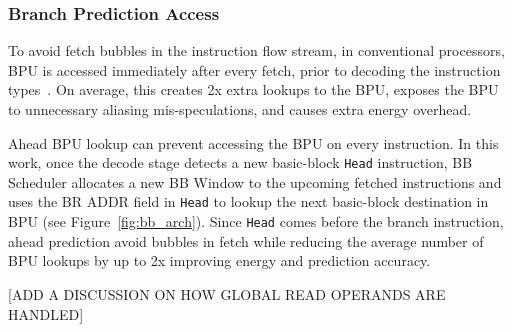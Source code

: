 \subsubsection{Branch Prediction Access}

To avoid fetch bubbles in the instruction flow stream, in conventional
processors, BPU is accessed immediately after every fetch, prior to decoding the
instruction types~\cite{ref:EV8}. On average, this creates 2x extra lookups to
the BPU, exposes the BPU to unnecessary aliasing mis-speculations, and causes
extra energy overhead.

Ahead BPU lookup can prevent accessing the BPU on every instruction. In this
work, once the decode stage detects a new basic-block \texttt{Head} instruction,
    BB Scheduler allocates a new BB Window to the upcoming fetched instructions
    and uses the BR ADDR field in \texttt{Head} to lookup the next basic-block
    destination in BPU (see Figure~\ref{fig:bb_arch}). Since \texttt{Head} comes
    before the branch instruction, ahead prediction avoid bubbles in fetch while
    reducing the average number of BPU lookups by up to 2x improving energy and
    prediction accuracy.


[ADD A DISCUSSION ON HOW GLOBAL READ OPERANDS ARE HANDLED]
